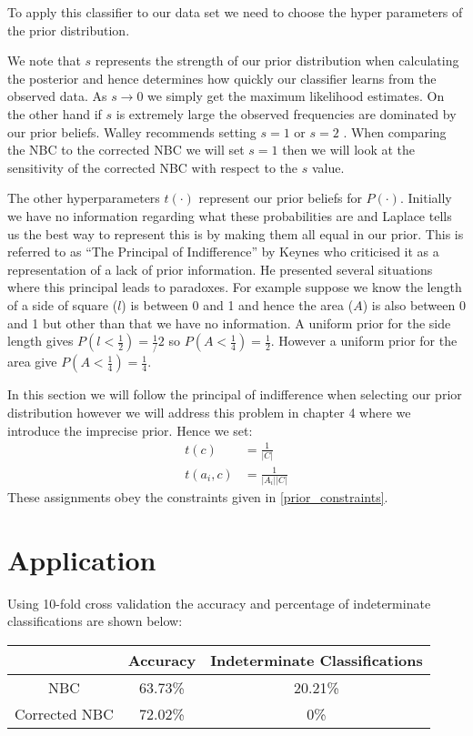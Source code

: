 To apply this classifier to our data set we need to choose the hyper parameters of the prior distribution.

We note that $s$ represents the strength of our prior distribution when calculating the posterior and hence determines how quickly our classifier learns from the observed data.
As $s \rightarrow 0$ we simply get the maximum likelihood estimates.
On the other hand if $s$ is extremely large the observed frequencies are dominated by our prior beliefs.
Walley recommends setting $s=1$ or $s=2$ \cite{Walley96}.
When comparing the NBC to the corrected NBC we will set $s=1$ then we will look at the sensitivity of the corrected NBC with respect to the $s$ value.

The other hyperparameters $t(\cdot)$ represent our prior beliefs for $P(\cdot)$.
Initially we have no information regarding what these probabilities are and Laplace tells us \cite{laplace1812} the best way to represent this is by making them all equal in our prior.
This is referred to as ``The Principal of Indifference'' by Keynes \cite{Keynes21} who criticised it as a representation of a lack of prior information.
He presented several situations where this principal leads to paradoxes.
For example suppose we know the length of a side of square ($l$) is between 0 and 1 and hence the area ($A$) is also between 0 and 1 but other than that we have no information.
A uniform prior for the side length gives $P(l < \frac{1}{2}) = \frac{1}/{2}$ so $P(A < \frac{1}{4}) = \frac{1}{2}$.
However a uniform prior for the area give $P(A < \frac{1}{4}) = \frac{1}{4}$.

In this section we will follow the principal of indifference when selecting our prior distribution however we will address this problem in chapter 4 where we introduce the imprecise prior.
Hence we set:
\begin{align}\label{initial prior}
	t(c)      & = \frac{1}{|C|} \\
	t(a_i, c) & = \frac{1}{|A_i||C|}
\end{align}
These assignments obey the constraints given in \cref{prior_constraints}.

\section{Application}

Using 10-fold cross validation the accuracy and percentage of indeterminate classifications are shown below:
\begin{center}
	\begin{tabular}{ c|c c }
		              & Accuracy & Indeterminate Classifications \\
		\hline
		NBC           & 63.73\%  & 20.21\%                       \\
		Corrected NBC & 72.02\%  & 0\%
	\end{tabular}
\end{center}


